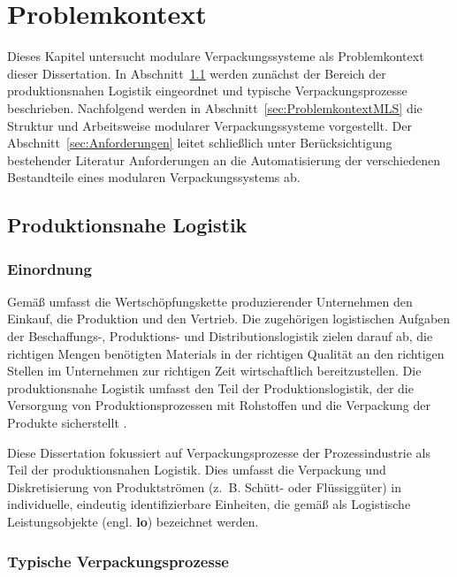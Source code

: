 \chapter{Problemkontext}
\label{chap:problemkontext}

Dieses Kapitel untersucht modulare Verpackungssysteme als Problemkontext dieser Dissertation. In Abschnitt~\ref{sec:ProduktionsnaheLogistik} werden zunächst der Bereich der produktionsnahen Logistik eingeordnet und typische Verpackungsprozesse beschrieben. Nachfolgend werden in Abschnitt~\ref{sec:ProblemkontextMLS} die Struktur und Arbeitsweise modularer Verpackungssysteme vorgestellt. Der Abschnitt~\ref{sec:Anforderungen} leitet schließlich unter Berücksichtigung bestehender Literatur Anforderungen an die Automatisierung der verschiedenen Bestandteile eines modularen Verpackungssystems ab. 

\section{Produktionsnahe Logistik}
\label{sec:ProduktionsnaheLogistik}

\subsection{Einordnung}
\label{subsec:EinordnungProduktionsnaheLogistik}

Gemäß \cite{DIN.2015} umfasst die Wertschöpfungskette produzierender Unternehmen den Einkauf, die Produktion und den Vertrieb. Die zugehörigen logistischen Aufgaben der Beschaffungs-, Produktions- und Distributionslogistik zielen darauf ab, die richtigen Mengen benötigten Materials in der richtigen Qualität an den richtigen Stellen im Unternehmen zur richtigen Zeit wirtschaftlich bereitzustellen. Die produktionsnahe Logistik umfasst den Teil der Produktionslogistik, der die Versorgung von Produktionsprozessen mit Rohstoffen und die Verpackung der Produkte sicherstellt \cite{Kessler.2015,NAMURAK4.19.2020}.

Diese Dissertation fokussiert auf Verpackungsprozesse der Prozessindustrie als Teil der produktionsnahen Logistik. Dies umfasst die Verpackung und Diskretisierung von Produktströmen (z.~B. Schütt- oder Flüssiggüter) in individuelle, eindeutig identifizierbare Einheiten, die gemäß \cite{NAMURAK4.19.2020} als Logistische Leistungsobjekte (engl. \textbf{\gls{lo}}) bezeichnet werden.
 
\subsection{Typische Verpackungsprozesse}
\label{subsec:Verpackungsprozesse}

